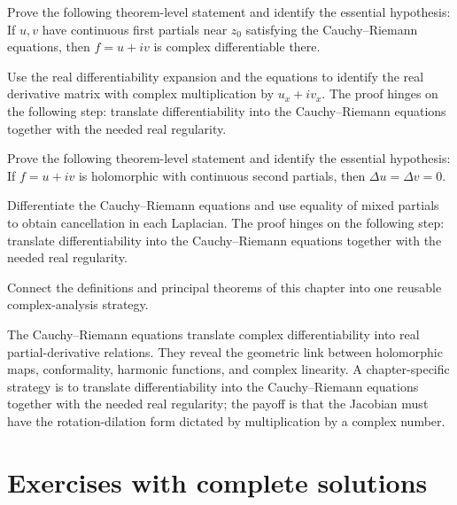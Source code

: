 \begin{problem}\label{prob:iv02-problem-10}
Prove the following theorem-level statement and identify the essential hypothesis: If $u,v$ have continuous first partials near $z_0$ satisfying the Cauchy--Riemann equations, then $f=u+iv$ is complex differentiable there.
\end{problem}
\begin{solution}
Use the real differentiability expansion and the equations to identify the real derivative matrix with complex multiplication by $u_x+iv_x$. The proof hinges on the following step: translate differentiability into the Cauchy--Riemann equations together with the needed real regularity.
\end{solution}

\begin{problem}[Harmonicity]\label{prob:iv02-problem-11}
Prove the following theorem-level statement and identify the essential hypothesis: If $f=u+iv$ is holomorphic with continuous second partials, then $\Delta u=\Delta v=0$.
\end{problem}
\begin{solution}
Differentiate the Cauchy--Riemann equations and use equality of mixed partials to obtain cancellation in each Laplacian. The proof hinges on the following step: translate differentiability into the Cauchy--Riemann equations together with the needed real regularity.
\end{solution}

\begin{problem}\label{prob:iv02-problem-12}
Connect the definitions and principal theorems of this chapter into one reusable complex-analysis strategy.
\end{problem}
\begin{solution}
The Cauchy–Riemann equations translate complex differentiability into real partial-derivative relations. They reveal the geometric link between holomorphic maps, conformality, harmonic functions, and complex linearity. A chapter-specific strategy is to translate differentiability into the Cauchy--Riemann equations together with the needed real regularity; the payoff is that the Jacobian must have the rotation-dilation form dictated by multiplication by a complex number.
\end{solution}

\section{Exercises with complete solutions}

